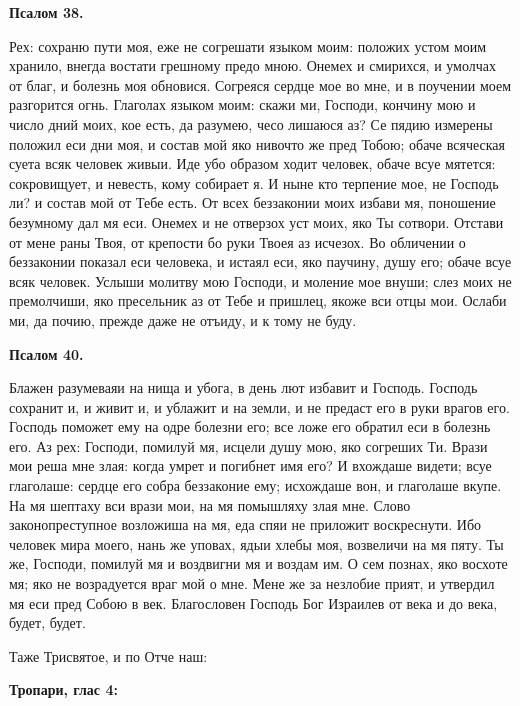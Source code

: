 \medskip


\bfseries Псалом 38.\normalfont{}\nopagebreak


Рех: сохраню пути моя, еже не согрешати языком моим: положих устом моим хранило, внегда востати грешному предо мною. Онемех и смирихся, и умолчах от благ, и болезнь моя обновися. Согреяся сердце мое во мне, и в поучении моем разгорится огнь. Глаголах языком моим: скажи ми, Господи, кончину мою и число дний моих, кое есть, да разумею, чесо лишаюся аз? Се пядию измерены положил еси дни моя, и состав мой яко нивочто же пред Тобою; обаче всяческая суета всяк человек живыи. Иде убо образом ходит человек, обаче всуе мятется: сокровищует, и невесть, кому собирает я. И ныне кто терпение мое, не Господь ли? и состав мой от Тебе есть. От всех беззаконии моих избави мя, поношение безумному дал мя еси. Онемех и не отверзох уст моих, яко Ты сотвори. Отстави от мене раны Твоя, от крепости бо руки Твоея аз исчезох. Во обличении о беззаконии показал еси человека, и истаял еси, яко паучину, душу его; обаче всуе всяк человек. Услыши молитву мою Господи, и моление мое внуши; слез моих не премолчиши, яко пресельник аз от Тебе и пришлец, якоже вси отцы мои. Ослаби ми, да почию, прежде даже не отъиду, и к тому не буду.


\medskip


\bfseries Псалом 40.\normalfont{}\nopagebreak


Блажен разумеваяи на нища и убога, в день лют избавит и Господь. Господь сохранит и, и живит и, и ублажит и на земли, и не предаст его в руки врагов его. Господь поможет ему на одре болезни его; все ложе его обратил еси в болезнь его. Аз рех: Господи, помилуй мя, исцели душу мою, яко согреших Ти. Врази мои реша мне злая: когда умрет и погибнет имя его? И вхождаше видети; всуе глаголаше: сердце его собра беззаконие ему; исхождаше вон, и глаголаше вкупе. На мя шептаху вси врази мои, на мя помышляху злая мне. Слово законопреступное возложиша на мя, еда спяи не приложит воскреснути. Ибо человек мира моего, нань же уповах, ядыи хлебы моя, возвеличи на мя пяту. Ты же, Господи, помилуй мя и воздвигни мя и воздам им. О сем познах, яко восхоте мя; яко не возрадуется враг мой о мне. Мене же за незлобие прият, и утвердил мя еси пред Собою в век. Благословен Господь Бог Израилев от века и до века, будет, будет.

Таже Трисвятое, и по Отче наш:


\medskip


\bfseries Тропари, глас 4:\normalfont{}\nopagebreak


